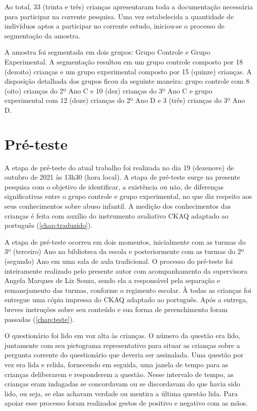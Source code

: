 Ao total, 33 (trinta e três) crianças apresentaram toda a documentação necessária para participar na corrente pesquisa. Uma vez estabelecida a quantidade de indivíduos aptos a participar no corrente estudo, iniciou-se o processo de segmentação da amostra. 

A amostra foi segmentada em dois grupos: Grupo Controle e Grupo Experimental. A segmentação resultou em um grupo controle composto por 18 (dezoito) crianças e um grupo experimental composto por 15 (quinze) crianças. A disposição detalhada dos grupos ficou da seguinte maneira: grupo controle com 8 (oito) crianças do 2º Ano C e 10 (dez) crianças do 3º Ano C e grupo experimental com 12 (doze) crianças do 2º Ano D e 3 (três) crianças do 3º Ano D.


\section{Pré-teste}\label{sec:pretes}

A etapa de pré-teste do atual trabalho foi realizada no dia 19 (dezenove) de outubro de 2021 às 13h30 (hora local). A etapa de pré-teste surge na presente pesquisa com o objetivo de identificar, a existência ou não, de diferenças significativas entre o grupo controle e grupo experimental, no que diz respeito aos seus conhecimentos sobre abuso infantil. A medição dos conhecimentos das crianças é feita com auxílio do instrumento avaliativo \acf{CKAQ} adaptado ao português (\autoref{chap:traduzido}). 

A etapa de pré-teste ocorreu em dois momentos, inicialmente com as turmas do 3º (terceiro) Ano na biblioteca da escola e posteriormente com as turmas do 2º (segundo) Ano em uma sala de aula tradicional. O processo do pré-teste foi inteiramente realizado pelo presente autor com acompanhamento da supervisora Angela Marques de Liz Souza, sendo ela a responsável pela separação e remanejamento das turmas, conforme o regimento escolar. À todas as crianças foi entregue uma cópia impressa do \ac{CKAQ} adaptado ao português. Após a entrega, breves instruções sobre seu conteúdo e sua forma de preenchimento foram passadas (\autoref{chap:teste}). %

O questionário foi lido em voz alta às crianças. O número da questão era lido, juntamente com seu pictograma representativo para situar as crianças sobre a pergunta corrente do questionário que deveria ser assinalada. Uma questão por vez era lida e relida, fornecendo em seguida, uma janela de tempo para as crianças deliberarem e responderem a questão. Nesse intervalo de tempo, as crianças eram indagadas se concordavam ou se discordavam do que havia sido lido, ou seja, se elas achavam verdade ou mentira a última questão lida. Para apoiar esse processo foram realizados gestos de positivo e negativo com as mãos.

